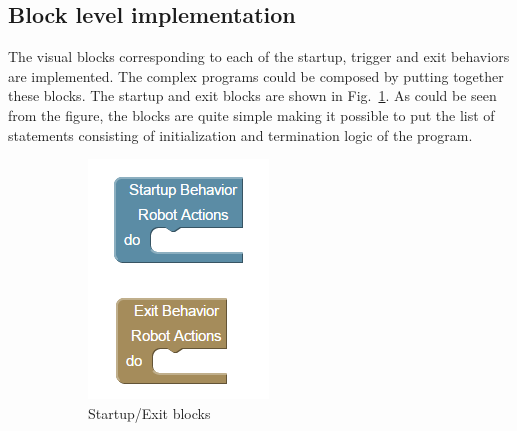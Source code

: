 \subsection{Block level implementation}
\label{sec:block_impl}
The visual blocks corresponding to each of the startup, trigger and exit behaviors are implemented. The complex programs could be composed by putting together these blocks. The startup and exit blocks are shown in Fig.~\ref{fig:blocks_init}. As could be seen from the figure, the blocks are quite simple making it possible to put the list of statements consisting of initialization and termination logic of the program. 
\begin{figure}[H]
\begin{subfigure}[t]{0.28\textwidth}
\includegraphics[width=\textwidth]{../thesis/assets/blocks_init.png}
\caption[Startup/Exit blocks]{Startup/Exit blocks}
\label{fig:blocks_init}
\end{subfigure}
\begin{subfigure}[t]{0.33\textwidth}

\end{subfigure}
\end{figure}
